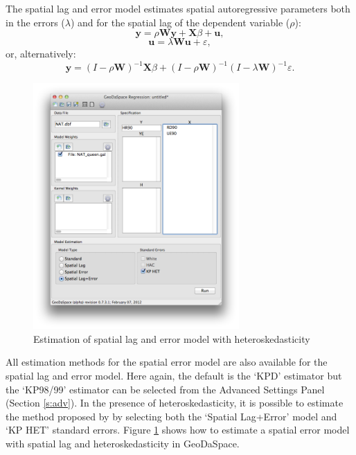 \documentclass{article}
\begin{document}
The spatial lag and error model estimates spatial autoregressive parameters both in the errors ($\lambda$) and for the spatial lag of the dependent variable ($\rho$):
\begin{equation}
\mathbf{y} = \rho \mathbf{W} \mathbf{y} + \mathbf{X}\beta + \mathbf{u},
\end{equation}
\begin{equation}
\mathbf{u} =  \lambda \mathbf{W} \mathbf{u} + \varepsilon,
\end{equation}
or, alternatively:
\begin{equation}
\mathbf{y} =  (I - \rho \mathbf{W})^{-1} \mathbf{X}\beta + (I - \rho \mathbf{W})^{-1}(I - \lambda \mathbf{W})^{-1} \varepsilon.
\end{equation}


\begin{figure}[htb]
\centering
\includegraphics[width=0.7\textwidth]{GS_het_combo.png}
\caption{Estimation of spatial lag and error model with heteroskedasticity}
\label{f:GS_het_combo}
\end{figure}

All estimation methods for the spatial error model are also available for the spatial lag and error model. Here again, the default is the `KPD' estimator but the `KP98/99' estimator can be selected from the Advanced Settings Panel (Section \ref{s:adv}). In the presence of heteroskedasticity, it is possible to estimate the method proposed by \citet{Arraiz10} by selecting both the `Spatial Lag+Error' model and `KP HET' standard errors. Figure \ref{f:GS_het_combo} shows how to estimate a spatial error model with spatial lag and heteroskedasticity in GeoDaSpace.
\FloatBarrier
\end{document}
